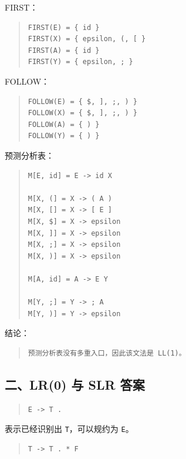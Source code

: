 \documentclass[UTF8,zihao=-4]{ctexart}
\begin{document}
FIRST：

\begin{quote}
\footnotesize
\begin{verbatim}
FIRST(E) = { id }
FIRST(X) = { epsilon, (, [ }
FIRST(A) = { id }
FIRST(Y) = { epsilon, ; }
\end{verbatim}
\end{quote}

FOLLOW：

\begin{quote}
\footnotesize
\begin{verbatim}
FOLLOW(E) = { $, ], ;, ) }
FOLLOW(X) = { $, ], ;, ) }
FOLLOW(A) = { ) }
FOLLOW(Y) = { ) }
\end{verbatim}
\end{quote}

预测分析表：

\begin{quote}
\footnotesize
\begin{verbatim}
M[E, id] = E -> id X

M[X, (] = X -> ( A )
M[X, [] = X -> [ E ]
M[X, $] = X -> epsilon
M[X, ]] = X -> epsilon
M[X, ;] = X -> epsilon
M[X, )] = X -> epsilon

M[A, id] = A -> E Y

M[Y, ;] = Y -> ; A
M[Y, )] = Y -> epsilon
\end{verbatim}
\end{quote}

结论：

\begin{quote}
\footnotesize
\begin{verbatim}
预测分析表没有多重入口，因此该文法是 LL(1)。
\end{verbatim}
\end{quote}

\subsection*{二、LR(0) 与 SLR 答案}

\begin{quote}
\footnotesize
\begin{verbatim}
E -> T .
\end{verbatim}
\end{quote}

表示已经识别出 \texttt{T}，可以规约为 \texttt{E}。

\begin{quote}
\footnotesize
\begin{verbatim}
T -> T . * F
\end{verbatim}
\end{quote}
\end{document}
